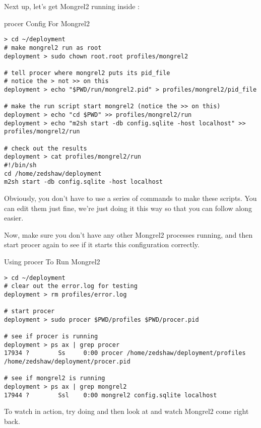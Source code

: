 Next up, let's get Mongrel2 running inside :

\begin{code}{procer Config For Mongrel2}
\begin{Verbatim}
> cd ~/deployment
# make mongrel2 run as root
deployment > sudo chown root.root profiles/mongrel2

# tell procer where mongrel2 puts its pid_file
# notice the > not >> on this
deployment > echo "$PWD/run/mongrel2.pid" > profiles/mongrel2/pid_file

# make the run script start mongrel2 (notice the >> on this)
deployment > echo "cd $PWD" >> profiles/mongrel2/run
deployment > echo "m2sh start -db config.sqlite -host localhost" >> profiles/mongrel2/run

# check out the results
deployment > cat profiles/mongrel2/run
#!/bin/sh
cd /home/zedshaw/deployment
m2sh start -db config.sqlite -host localhost
\end{Verbatim}
\end{code}

Obviously, you don't have to use a series of  commands to
make these scripts.  You can edit them just fine, we're just doing it
this way so that you can follow along easier.

Now, make sure you don't have any other Mongrel2 processes running,
and then start procer again to see if it starts this configuration
correctly.


\begin{code}{Using procer To Run Mongrel2}
\begin{Verbatim}
> cd ~/deployment
# clear out the error.log for testing
deployment > rm profiles/error.log

# start procer
deployment > sudo procer $PWD/profiles $PWD/procer.pid

# see if procer is running
deployment > ps ax | grep procer
17934 ?        Ss     0:00 procer /home/zedshaw/deployment/profiles /home/zedshaw/deployment/procer.pid

# see if mongrel2 is running
deployment > ps ax | grep mongrel2
17944 ?        Ssl    0:00 mongrel2 config.sqlite localhost

\end{Verbatim}
\end{code}

To watch  in action, try doing  and then look at  and watch
Mongrel2 come right back.


